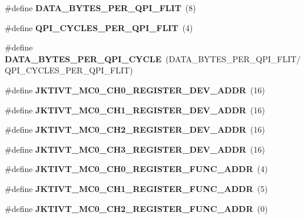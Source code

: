 \begin{DoxyCompactItemize}
\item 
\#define {\bfseries D\+A\+T\+A\+\_\+\+B\+Y\+T\+E\+S\+\_\+\+P\+E\+R\+\_\+\+Q\+P\+I\+\_\+\+F\+L\+IT}~(8)\label{types_8h_a540be752b2e9b368dbb804446efd390b}

\item 
\#define {\bfseries Q\+P\+I\+\_\+\+C\+Y\+C\+L\+E\+S\+\_\+\+P\+E\+R\+\_\+\+Q\+P\+I\+\_\+\+F\+L\+IT}~(4)\label{types_8h_a63227b05004851e54be2db2f0863ea54}

\item 
\#define {\bfseries D\+A\+T\+A\+\_\+\+B\+Y\+T\+E\+S\+\_\+\+P\+E\+R\+\_\+\+Q\+P\+I\+\_\+\+C\+Y\+C\+LE}~(D\+A\+T\+A\+\_\+\+B\+Y\+T\+E\+S\+\_\+\+P\+E\+R\+\_\+\+Q\+P\+I\+\_\+\+F\+L\+IT/Q\+P\+I\+\_\+\+C\+Y\+C\+L\+E\+S\+\_\+\+P\+E\+R\+\_\+\+Q\+P\+I\+\_\+\+F\+L\+IT)\label{types_8h_af5b12c3c9c14cefa6ab4c2ea6807e1b9}

\item 
\#define {\bfseries J\+K\+T\+I\+V\+T\+\_\+\+M\+C0\+\_\+\+C\+H0\+\_\+\+R\+E\+G\+I\+S\+T\+E\+R\+\_\+\+D\+E\+V\+\_\+\+A\+D\+DR}~(16)\label{types_8h_a7ec9fcd9e4c9625ba4a1f10c91ec6586}

\item 
\#define {\bfseries J\+K\+T\+I\+V\+T\+\_\+\+M\+C0\+\_\+\+C\+H1\+\_\+\+R\+E\+G\+I\+S\+T\+E\+R\+\_\+\+D\+E\+V\+\_\+\+A\+D\+DR}~(16)\label{types_8h_a6290255155244c1f6a1613b223e93948}

\item 
\#define {\bfseries J\+K\+T\+I\+V\+T\+\_\+\+M\+C0\+\_\+\+C\+H2\+\_\+\+R\+E\+G\+I\+S\+T\+E\+R\+\_\+\+D\+E\+V\+\_\+\+A\+D\+DR}~(16)\label{types_8h_a8850e2fcc2ffe596f04a164ca3207cea}

\item 
\#define {\bfseries J\+K\+T\+I\+V\+T\+\_\+\+M\+C0\+\_\+\+C\+H3\+\_\+\+R\+E\+G\+I\+S\+T\+E\+R\+\_\+\+D\+E\+V\+\_\+\+A\+D\+DR}~(16)\label{types_8h_a7ef1d592aa43da255e0faa532f506af1}

\item 
\#define {\bfseries J\+K\+T\+I\+V\+T\+\_\+\+M\+C0\+\_\+\+C\+H0\+\_\+\+R\+E\+G\+I\+S\+T\+E\+R\+\_\+\+F\+U\+N\+C\+\_\+\+A\+D\+DR}~(4)\label{types_8h_a34a91902211f34228e7295b2f5a8434f}

\item 
\#define {\bfseries J\+K\+T\+I\+V\+T\+\_\+\+M\+C0\+\_\+\+C\+H1\+\_\+\+R\+E\+G\+I\+S\+T\+E\+R\+\_\+\+F\+U\+N\+C\+\_\+\+A\+D\+DR}~(5)\label{types_8h_a30a607d052dd9925ea7fc5c2b1782298}

\item 
\#define {\bfseries J\+K\+T\+I\+V\+T\+\_\+\+M\+C0\+\_\+\+C\+H2\+\_\+\+R\+E\+G\+I\+S\+T\+E\+R\+\_\+\+F\+U\+N\+C\+\_\+\+A\+D\+DR}~(0)\label{types_8h_a91b1ef7fb933a2d9892afed9875761bf}


\end{DoxyCompactItemize}

